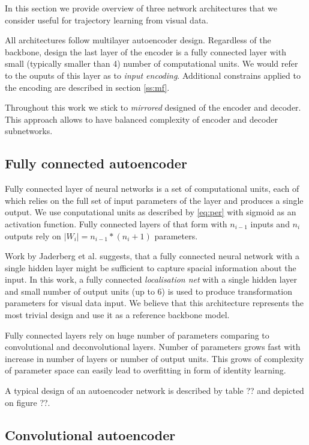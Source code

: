 In this section we provide overview of three network architectures that we consider useful for trajectory learning from visual data.

All architectures follow multilayer autoencoder design.
Regardless of the backbone, design the last layer of the encoder is a fully connected layer with small (typically smaller than 4) number of computational units. We would refer to the ouputs of this layer as to  \textit{input encoding}.
Additional constrains applied to the encoding are described in section \ref{ss:mf}.

Throughout this work we stick to \textit{mirrored} designed of the encoder and decoder.
This approach allows to have balanced complexity of encoder and decoder subnetworks.

\subsection{Fully connected autoencoder}

Fully connected layer of neural networks is a set of computational units, each of which relies on the full set of input parameters of the layer and produces a single output.
We use conputational units as described by \ref{eq:per} with sigmoid as an activation function.
Fully connected layers of that form with $n_{i-1}$ inputs and $n_i$ outputs rely on $|W_i|=n_{i-1}*(n_i+1)$ parameters.

Work by Jaderberg et al. \cite{Jaderberg2015} suggests, that a fully connected neural network with a single hidden layer might be sufficient to capture spacial information about the input.
In this work, a fully connected \textit{localisation net} with a single hidden layer and small number of output units (up to 6) is used to produce transformation parameters for visual data input.
We believe that this architecture represents the most trivial design and use it as a reference backbone model.

Fully connected layers rely on huge number of parameters comparing to convolutional and deconvolutional layers. Number of parameters grows fast with increase in number of layers or number of output units. This grows of complexity of parameter space can easily lead to overfitting in form of identity learning.

A typical design of an autoencoder network is described by table ?? and depicted on figure ??.

\subsection{Convolutional autoencoder}

